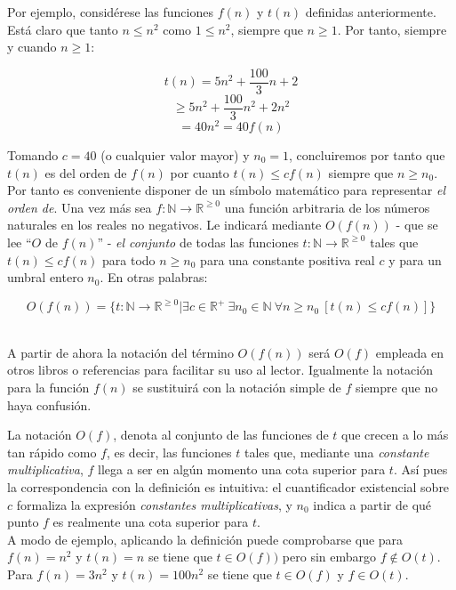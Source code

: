Por ejemplo, considérese las funciones $f(n)$ y $t(n)$ definidas anteriormente. Está claro que tanto $n \leq n^2$ como $1 \leq n^2$, siempre que $n \geq 1$. Por tanto, siempre y cuando $n \geq 1$:

\begin{center}
\[ t(n) = 5n^2 + \frac{100}{3}n + 2 \]
\[ \geq 5n^2 + \frac{100}{3}n^2 + 2n^2 \]
\[ = 40n^2 = 40 f(n) \]
\end{center}

Tomando $c = 40$ (o cualquier valor mayor) y $n_0 = 1$, concluiremos por tanto que $t(n)$ es del orden de $f(n)$ por cuanto $t(n) \leq cf(n)$ siempre que $n \geq n_0$. Por tanto es conveniente disponer de un símbolo matemático para representar \emph{el orden de}. Una vez más sea $f: \mathbb{N} \rightarrow \mathbb{R}^{\geq 0}$ una función arbitraria de los números naturales en los reales no negativos. Le indicará mediante $O(f(n))$ - que se lee ``$O$ de $f(n)$'' - \emph{el conjunto} de todas las funciones $t: \mathbb{N} \rightarrow \mathbb{R}^{\geq 0}$ tales que $t(n) \leq cf(n)$ para todo $n \geq n_0$ para una constante positiva real $c$ y para un umbral entero $n_0$. En otras palabras:
\begin{center}
\[ O(f(n)) = \big\{ t: \mathbb{N} \rightarrow \mathbb{R}^{\geq 0} \big| \exists c \in \mathbb{R}^+\ \exists n_0 \in \mathbb{N}\ \forall n \geq n_0\ [t(n) \leq cf(n)] \big\} \]\\
\end{center}

\begin{nota}
A partir de ahora la notación del término $O(f(n))$ será $O(f)$ empleada en otros libros o referencias para facilitar su uso al lector. Igualmente la notación para la función $f(n)$ se sustituirá con la notación simple de $f$ siempre que no haya confusión.\\
\end{nota}

La notación $O(f)$, denota al conjunto de las funciones de $t$ que crecen a lo más tan rápido como $f$, es decir, las funciones $t$ tales que, mediante una \emph{constante multiplicativa}, $f$ llega a ser en algún momento una cota superior para $t$. Así pues la correspondencia con la definición es intuitiva: el cuantificador existencial sobre $c$ formaliza la expresión \emph{constantes multiplicativas}, y $n_0$ indica a partir de qué punto $f$ es realmente una cota superior para $t$.\\

A modo de ejemplo, aplicando la definición puede comprobarse que para $f(n) = n^2$ y $t(n) = n$ se tiene que $t \in O(f))$ pero sin embargo $f \notin O(t)$. Para $f(n) = 3n^2$ y $t(n) = 100n^2$ se tiene que $t \in O(f)$ y $f \in O(t)$.\\

